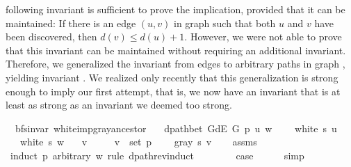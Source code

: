 \begin{isabellebody}
\begin{isamarkuptext}
following invariant is sufficient to prove the implication, provided that it can be maintained: If
there is an edge $(u,v)$ in graph  such that both $u$ and $v$ have been discovered, then
$d(v)\leq d(u)+1$. However, we were not able to prove that this invariant can be maintained without
requiring an additional invariant. Therefore, we generalized the invariant from edges to arbitrary
paths in graph , yielding invariant . We realized
only recently that this generalization is strong enough to imply our first attempt, that is, we now
have an invariant that is at least as strong as an invariant we deemed too strong.%
\end{isamarkuptext}\isamarkuptrue%
\isamarkupfalse%
\ {\isacharparenleft}{\kern0pt}\ bfs{\isacharunderscore}{\kern0pt}invar{\isacharparenright}{\kern0pt}\ white{\isacharunderscore}{\kern0pt}imp{\isacharunderscore}{\kern0pt}gray{\isacharunderscore}{\kern0pt}ancestor{\isacharcolon}{\kern0pt}\isanewline
\ \ \ {\isachardoublequoteopen}dpath{\isacharunderscore}{\kern0pt}bet\ {\isacharparenleft}{\kern0pt}G{\isachardot}{\kern0pt}dE\ G{\isacharparenright}{\kern0pt}\ p\ u\ w{\isachardoublequoteclose}\isanewline
\ \ \ {\isachardoublequoteopen}{\isasymnot}\ white\ s\ u{\isachardoublequoteclose}\isanewline
\ \ \ {\isachardoublequoteopen}white\ s\ w{\isachardoublequoteclose}\isanewline
\ \ \ v\ \isanewline
\ \ \ \ {\isachardoublequoteopen}v\ {\isasymin}\ set\ p{\isachardoublequoteclose}\isanewline
\ \ \ \ {\isachardoublequoteopen}gray\ s\ v{\isachardoublequoteclose}\isanewline
%
\isadelimproof
\ \ %
\endisadelimproof
%
\isatagproof
{}\isamarkupfalse%
\ assms%
\endisatagproof
{\isafoldproof}%
%
\isadelimproof
\isanewline
%
\endisadelimproof
%
\isadelimvisible
%
\endisadelimvisible
%
\isatagvisible
{}\isamarkupfalse%
\ {\isacharparenleft}{\kern0pt}induct\ p\ arbitrary{\isacharcolon}{\kern0pt}\ w\ rule{\isacharcolon}{\kern0pt}\ dpath{\isacharunderscore}{\kern0pt}rev{\isacharunderscore}{\kern0pt}induct{\isacharparenright}{\kern0pt}\isanewline
\ \ \isamarkupfalse%
\ {}\isanewline
\ \ \isamarkupfalse%
\ {\isacharquery}{\kern0pt}case\isanewline
\ \ \ \ \isamarkupfalse%
\ simp\isanewline
{}\isamarkupfalse%
\isanewline
\ \ \isamarkupfalse%

\end{isabellebody}
